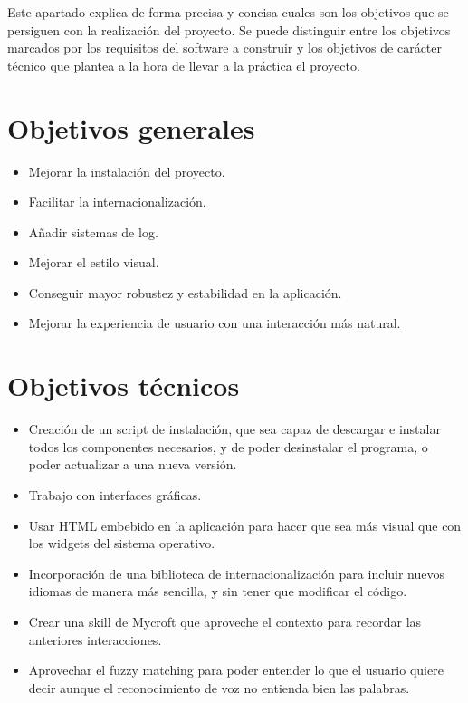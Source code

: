 
Este apartado explica de forma precisa y concisa cuales son los objetivos que se persiguen con la realización del proyecto. Se puede distinguir entre los objetivos marcados por los requisitos del software a construir y los objetivos de carácter técnico que plantea a la hora de llevar a la práctica el proyecto.

\section*{Objetivos generales}
\begin{itemize}
    \item Mejorar la instalación del proyecto.
    \item Facilitar la internacionalización.
    \item Añadir sistemas de log.
    \item Mejorar el estilo visual.
    \item Conseguir mayor robustez y estabilidad en la aplicación.
    \item Mejorar la experiencia de usuario con una interacción más natural.
\end{itemize}

\section*{Objetivos técnicos}
\begin{itemize}
    \item Creación de un script de instalación, que sea capaz de descargar e instalar todos los componentes necesarios, y de poder desinstalar el programa, o poder actualizar a una nueva versión.
    \item Trabajo con interfaces gráficas.
    \item Usar HTML embebido en la aplicación para hacer que sea más visual que con los widgets del sistema operativo.
    \item Incorporación de una biblioteca de internacionalización para incluir nuevos idiomas de manera más sencilla, y sin tener que modificar el código.
    \item Crear una skill de Mycroft que aproveche el contexto para recordar las anteriores interacciones.
    \item Aprovechar el fuzzy matching para poder entender lo que el usuario quiere decir aunque el reconocimiento de voz no entienda bien las palabras.
\end{itemize}
